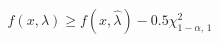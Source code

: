 \documentclass[12pt]{article}
\begin{document}
\pagestyle{empty}
\Large
{}
\pagecolor{ehandbook}

\boldmath
\begin{eqnarray*}
f(x,\lambda) \ge f(x,\hat{\lambda}) - 0.5 \chi^2_{1-\alpha, \, 1} 
\end{eqnarray*}
\end{document}
